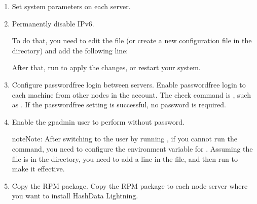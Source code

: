 \documentclass[letterpaper,10pt,english]{sphinxmanual}
\begin{document}
\begin{enumerate}
\begin{enumerate}
\end{enumerate}

\item {} 
\sphinxAtStartPar
Set system parameters on each server.

\item {} 
\sphinxAtStartPar
Permanently disable IPv6.

\sphinxAtStartPar
To do that, you need to edit the  file (or create a new configuration file in the  directory) and add the following line:

\begin{sphinxVerbatim}[commandchars=\\\{\}]
  
  
\end{sphinxVerbatim}

\sphinxAtStartPar
After that, run  to apply the changes, or restart your system.

\item {} 
\sphinxAtStartPar
Configure password\sphinxhyphen{}free login between servers. Enable password\sphinxhyphen{}free login to each machine from other nodes in the  account. The check command is , such as . If the password\sphinxhyphen{}free setting is successful, no password is required.

\item {} 
\sphinxAtStartPar
Enable the gpadmin user to perform  without password.

\begin{sphinxadmonition}{note}{Note:}
\sphinxAtStartPar
After switching to the  user by running , if you cannot run the  command, you need to configure the environment variable for . Assuming the  file is in the  directory, you need to add a line  in the  file, and then run  to make it effective.
\end{sphinxadmonition}

\item {} 
\sphinxAtStartPar
Copy the RPM package. Copy the RPM package to each node server where you want to install HashData Lightning.

\end{enumerate}
\end{document}
